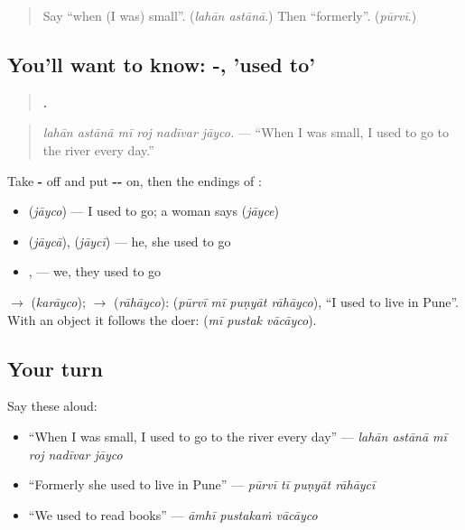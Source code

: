 \label{lesson:MR-C278-jayco}



\begin{quote}
Say \textquotedblleft{}when (I was) small\textquotedblright{}. (\emph{lahān astānā}.) Then \textquotedblleft{}formerly\textquotedblright{}. (\emph{pūrvī}.)
\end{quote}

\subsection*{You'll want to know: -, 'used to'}
\begin{quote}
\textbf{     .}
\end{quote}

\begin{quote}
\emph{lahān astānā mī roj nadīvar jāyco.} — \textquotedblleft{}When I was small, I used to go to the river every day.\textquotedblright{}
\end{quote}

Take \textbf{-} off and put \textbf{--} on, then the endings of \textbf{}:

\begin{itemize}
\raggedright
  \item \textbf{} \textbf{} (\emph{jāyco}) — I used to go; a woman says \textbf{} (\emph{jāyce})
  \item \textbf{} \textbf{} (\emph{jāycā}), \textbf{} \textbf{} (\emph{jāycī}) — he, she used to go
  \item \textbf{} \textbf{}, \textbf{} \textbf{} — we, they used to go
\end{itemize}

\textbf{} $\to$ \textbf{} (\emph{karāyco}); \textbf{} $\to$ \textbf{} (\emph{rāhāyco}): \textbf{   } (\emph{pūrvī mī puṇyāt rāhāyco}), \textquotedblleft{}I used to live in Pune\textquotedblright{}. With an object it follows the doer: \textbf{  } (\emph{mī pustak vācāyco}).

\subsection*{Your turn}
Say these aloud:

\begin{itemize}
\raggedright
  \item \textquotedblleft{}When I was small, I used to go to the river every day\textquotedblright{} — \emph{lahān astānā mī roj nadīvar jāyco}
  \item \textquotedblleft{}Formerly she used to live in Pune\textquotedblright{} — \emph{pūrvī tī puṇyāt rāhāycī}
  \item \textquotedblleft{}We used to read books\textquotedblright{} — \emph{āmhī pustakaṁ vācāyco}
\end{itemize}

